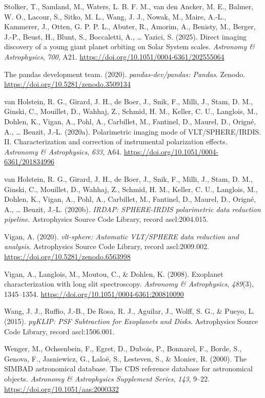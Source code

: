 \documentclass[
]{article}
\newlength{\cslhangindent}
\newenvironment{CSLReferences}[2] %
 {\begin{list}{}{%
  \setlength{\itemindent}{0pt}
  \setlength{\leftmargin}{0pt}
  \setlength{\parsep}{0pt}
  \ifodd #1
   \setlength{\leftmargin}{\cslhangindent}
   \setlength{\itemindent}{-1\cslhangindent}
  \fi
  \setlength{\itemsep}{#2\baselineskip}}}
 {\end{list}}
\begin{document}
\begin{CSLReferences}{1}{0}
Stolker, T., Samland, M., Waters, L. B. F. M., van den Ancker, M. E.,
Balmer, W. O., Lacour, S., Sitko, M. L., Wang, J. J., Nowak, M., Maire,
A.-L., Kammerer, J., Otten, G. P. P. L., Abuter, R., Amorim, A.,
Benisty, M., Berger, J.-P., Beust, H., Blunt, S., Boccaletti, A.,
\ldots{} Yazici, S. (2025). {Direct imaging discovery of a young giant
planet orbiting on Solar System scales}. \emph{Astronomy \&
Astrophysics}, \emph{700}, A21.
\url{https://doi.org/10.1051/0004-6361/202555064}

The pandas development team. (2020). \emph{{pandas-dev/pandas: Pandas}}.
Zenodo. \url{https://doi.org/10.5281/zenodo.3509134}

van Holstein, R. G., Girard, J. H., de Boer, J., Snik, F., Milli, J.,
Stam, D. M., Ginski, C., Mouillet, D., Wahhaj, Z., Schmid, H. M.,
Keller, C. U., Langlois, M., Dohlen, K., Vigan, A., Pohl, A., Carbillet,
M., Fantinel, D., Maurel, D., Origné, A., \ldots{} Beuzit, J.-L.
(2020a). {Polarimetric imaging mode of VLT/SPHERE/IRDIS. II.
Characterization and correction of instrumental polarization effects}.
\emph{Astronomy \& Astrophysics}, \emph{633}, A64.
\url{https://doi.org/10.1051/0004-6361/201834996}

van Holstein, R. G., Girard, J. H., de Boer, J., Snik, F., Milli, J.,
Stam, D. M., Ginski, C., Mouillet, D., Wahhaj, Z., Schmid, H. M.,
Keller, C. U., Langlois, M., Dohlen, K., Vigan, A., Pohl, A., Carbillet,
M., Fantinel, D., Maurel, D., Origné, A., \ldots{} Beuzit, J.-L.
(2020b). \emph{{IRDAP: SPHERE-IRDIS polarimetric data reduction
pipeline}}. Astrophysics Source Code Library, record ascl:2004.015.

Vigan, A. (2020). \emph{{vlt-sphere: Automatic VLT/SPHERE data reduction
and analysis}}. Astrophysics Source Code Library, record ascl:2009.002.
\url{https://doi.org/10.5281/zenodo.6563998}

Vigan, A., Langlois, M., Moutou, C., \& Dohlen, K. (2008). {Exoplanet
characterization with long slit spectroscopy}. \emph{Astronomy \&
Astrophysics}, \emph{489}(3), 1345--1354.
\url{https://doi.org/10.1051/0004-6361:200810090}

Wang, J. J., Ruffio, J.-B., De Rosa, R. J., Aguilar, J., Wolff, S. G.,
\& Pueyo, L. (2015). \emph{{pyKLIP: PSF Subtraction for Exoplanets and
Disks}}. Astrophysics Source Code Library, record ascl:1506.001.

Wenger, M., Ochsenbein, F., Egret, D., Dubois, P., Bonnarel, F., Borde,
S., Genova, F., Jasniewicz, G., Laloë, S., Lesteven, S., \& Monier, R.
(2000). {The SIMBAD astronomical database. The CDS reference database
for astronomical objects}. \emph{Astronomy \& Astrophysics Supplement
Series}, \emph{143}, 9--22. \url{https://doi.org/10.1051/aas:2000332}

\end{CSLReferences}
\end{document}
